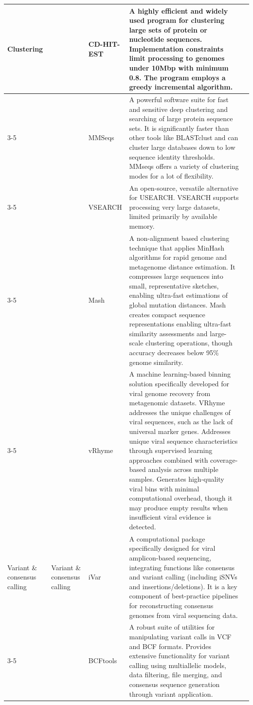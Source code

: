 \begin{longtable}{p{2cm}p{1.8cm}p{1.8cm}p{8.3cm}p{1cm}}
Clustering & & CD-HIT-EST & A highly efficient and widely used program for clustering large sets of protein or nucleotide sequences. Implementation constraints limit processing to genomes under 10Mbp with minimum 0.8. The program employs a greedy incremental algorithm. & \citep{Li2006-nj} \\
\cmidrule{3-5}
 & & MMSeqs & A powerful software suite for fast and sensitive deep clustering and searching of large protein sequence sets. It is significantly faster than other tools like BLASTclust and can cluster large databases down to low sequence identity thresholds. MMseqs offers a variety of clustering modes for a lot of flexibility. & \citep{Steinegger2017-ci} \\
\cmidrule{3-5}
 & & VSEARCH & An open-source, versatile alternative for USEARCH. VSEARCH supports processing very large datasets, limited primarily by available memory. & \citep{Rognes2016-ju} \\
\cmidrule{3-5}
 & & Mash & A non-alignment based clustering technique that applies MinHash algorithms for rapid genome and metagenome distance estimation. It compresses large sequences into small, representative sketches, enabling ultra-fast estimations of global mutation distances. Mash creates compact sequence representations enabling ultra-fast similarity assessments and large-scale clustering operations, though accuracy decreases below 95\% genome similarity. & \citep{Ondov2019-bo} \\
\cmidrule{3-5}
 & & vRhyme & A machine learning-based binning solution specifically developed for viral genome recovery from metagenomic datasets. VRhyme addresses the unique challenges of viral sequences, such as the lack of universal marker genes. Addresses unique viral sequence characteristics through supervised learning approaches combined with coverage-based analysis across multiple samples. Generates high-quality viral bins with minimal computational overhead, though it may produce empty results when insufficient viral evidence is detected. & \citep{Kieft2022-km} \\
\midrule

Variant \& consensus calling & Variant \& consensus calling & iVar & A computational package specifically designed for viral amplicon-based sequencing, integrating functions like consensus and variant calling (including iSNVs and insertions/deletions). It is a key component of best-practice pipelines for reconstructing consensus genomes from viral sequencing data. & \citep{Grubaugh2019-xd} \\
\cmidrule{3-5}
 & & BCFtools & A robust suite of utilities for manipulating variant calls in VCF and BCF formats. Provides extensive functionality for variant calling using multiallelic models, data filtering, file merging, and consensus sequence generation through variant application. & \citep{Danecek2021-je} \\
\bottomrule
\end{longtable}

